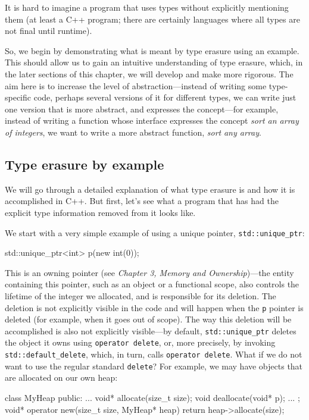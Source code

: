 It is hard to imagine a program that uses types without explicitly mentioning them (at least a C++ program; there are certainly languages where all types are not final until runtime).

So, we begin by demonstrating what is meant by type erasure using an example. This should allow us to gain an intuitive understanding of type erasure, which, in the later sections of this chapter, we will develop and make more rigorous. The aim here is to increase the level of abstraction---instead of writing some type-specific code, perhaps several versions of it for different types, we can write just one version that is more abstract, and expresses the concept---for example, instead of writing a function whose interface expresses the concept \emph{sort an array of integers}, we want to write a more abstract function, \emph{sort} \emph{any array}.

\subsection{Type erasure by example}

We will go through a detailed explanation of what type erasure is and how it is accomplished in C++. But first, let's see what a program that has had the explicit type information removed from it looks like.

We start with a very simple example of using a unique pointer, \texttt{std::unique\_ptr}:

\begin{code}
std::unique_ptr<int> p(new int(0));
\end{code}

This is an owning pointer (see \emph{Chapter 3, Memory and Ownership})---the entity containing this pointer, such as an object or a functional scope, also controls the lifetime of the integer we allocated, and is responsible for its deletion. The deletion is not explicitly visible in the code and will happen when the \texttt{p} pointer is deleted (for example, when it goes out of scope). The way this deletion will be accomplished is also not explicitly visible---by default, \texttt{std::unique\_ptr} deletes the object it owns using \texttt{operator\ delete}, or, more precisely, by invoking \texttt{std::default\_delete}, which, in turn, calls \texttt{operator\ delete}. What if we do not want to use the regular standard \texttt{delete}? For example, we may have objects that are allocated on our own heap:

\begin{code}
class MyHeap {
  public:
  ...
  void* allocate(size_t size);
  void deallocate(void* p);
  ...
};
void* operator new(size_t size, MyHeap* heap) {
  return heap->allocate(size);
}
\end{code}

